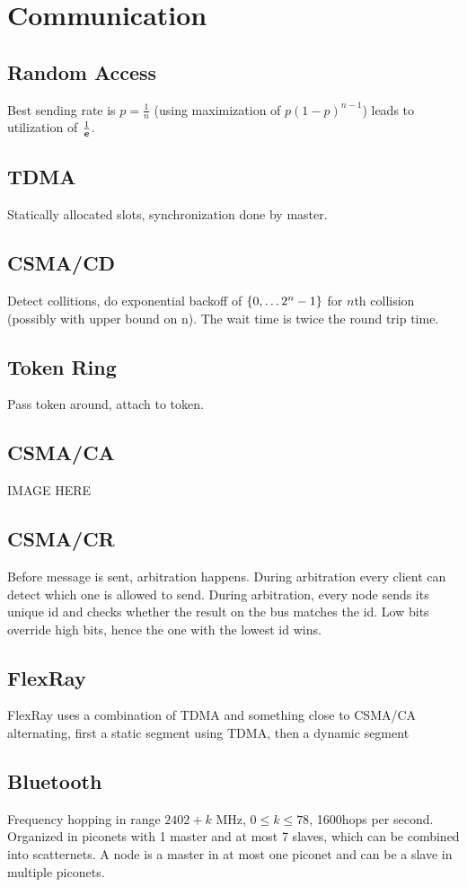 \section{Communication}
\subsection{Random Access}
Best sending rate is $p = \frac{1}{n}$ (using maximization of
$p \left(1 - p\right)^{n-1}$) leads to utilization of $\frac{1}{\boldsymbol{e}}$.

\subsection{TDMA}
Statically allocated slots, synchronization done by master.

\subsection{CSMA/CD}
Detect collitions, do exponential backoff of $\left\lbrace 0, \dots 2^n - 1 \right\rbrace$ for $n$th
collision (possibly with upper bound on n). The wait time is twice the round
trip time.

\subsection{Token Ring}
Pass token around, attach to token.

\subsection{CSMA/CA}
IMAGE HERE

\subsection{CSMA/CR}
Before message is sent, arbitration happens. During arbitration every client can
detect which one is allowed to send. During arbitration, every node sends its
unique id and checks whether the result on the bus matches the id. Low bits
override high bits, hence the one with the lowest id wins.

\subsection{FlexRay}
FlexRay uses a combination of TDMA and something close to CSMA/CA alternating,
first a static segment using TDMA, then a dynamic segment

\subsection{Bluetooth}
Frequency hopping in range $2402 + k$ MHz, $0 \leq k \leq 78$, 1600hops per
second. Organized in piconets with 1 master and at most 7 slaves, which can be
combined into scatternets. A node is a master in at most one piconet and can be
a slave in multiple piconets.


